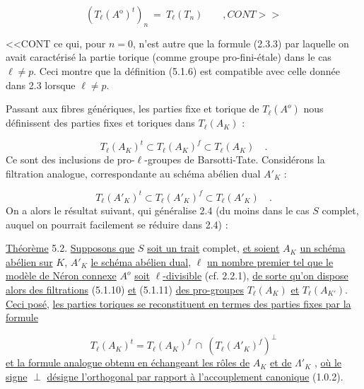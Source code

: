 \begin{equation}\tag{5.1.9}
(T_\ell(A^{\mathrm{o}})^t)_n \ = \ T_\ell(T_n) \qquad , CONT>>
\end{equation}


<<CONT ce qui, pour $n=0$, n'est autre que la formule (2.3.3) par laquelle on avait caractérisé la partie torique (comme groupe pro-fini-étale) dans le cas $\ell \neq p$. Ceci montre que la définition (5.1.6) est compatible avec celle donnée dans 2.3 lorsque $\ell \neq p$.

Passant aux fibres génériques, les parties fixe et torique de $T_\ell(A^o)$ nous définissent des parties fixes et toriques dans $T_\ell(A_K)$ :

\begin{equation}\tag{5.1.10}
T_\ell(A_K)^t \subset T_\ell(A_K)^f \subset T_\ell(A_K) \quad .
\end{equation}
Ce sont des inclusions de pro-$\ell$-groupes de Barsotti-Tate. Considérons la filtration analogue, correspondante au schéma abélien dual $A'_K$ :

\begin{equation}\tag{5.1.11}
T_\ell(A'_K)^t \subset T_\ell(A'_K)^f \subset T_\ell(A'_K) \quad .
\end{equation}
On a alors le résultat suivant, qui généralise 2.4 (du moins dans le cas $S$ complet, auquel on pourrait facilement se réduire dans 2.4) :

\underline{Théorème} 5.2. \underline{Supposons que} $S$ \underline{soit un trait} complet, \underline{et soient} $A_K$ \underline{un schéma abélien sur} $K$, $A'_K$ \underline{le schéma abélien dual}, $\ell$ \underline{un nombre premier tel que le modèle de Néron connexe} $A^o$ \underline{soit} $\ell$\underline{-divisible} (cf. 2.2.1), \underline{de sorte qu'on dispose alors des filtrations} (5.1.10) \underline{et} (5.1.11) \underline{des pro-groupes} $T_\ell(A_K)$ \underline{et} $T_\ell(A_{K'})$. \underline{Ceci posé}, \underline{les parties toriques se reconstituent en termes des parties fixes par la formule}

\begin{equation}\tag{5.2.1}
T_\ell(A_K)^t = T_\ell(A_K)^f \ \cap \ (T_\ell(A'_K)^f)^\perp
\end{equation}
\underline{et la formule analogue obtenu en échangeant les rôles de} $A_K$ \underline{et de} $\Lambda'_K$ , \underline{où le signe} $\perp$ \underline{désigne l'orthogonal par rapport à l'accouplement canonique} (1.0.2).


